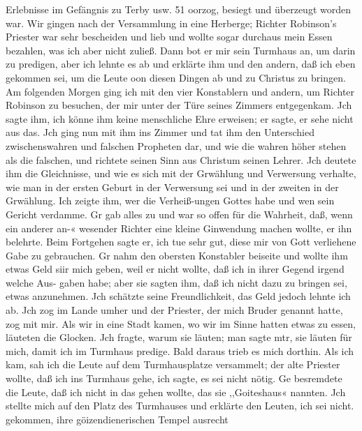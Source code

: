 Erlebnisse im Gefängnis zu Terby usw. 51
oorzog, besiegt und überzeugt worden war. Wir gingen nach
der Versammlung in eine Herberge; Richter Robinson’s Priester
war sehr bescheiden und lieb und wollte sogar durchaus mein
Essen bezahlen, was ich aber nicht zuließ. Dann bot er mir sein
Turmhaus an, um darin zu predigen, aber ich lehnte es ab und
erklärte ihm und den andern, daß ich eben gekommen sei, um die
Leute oon diesen Dingen ab und zu Christus zu bringen.
Am folgenden Morgen ging ich mit den vier Konstablern und
andern, um Richter Robinson zu besuchen, der mir unter der
Türe seines Zimmers entgegenkam. Jch sagte ihm, ich könne ihm
keine menschliche Ehre erweisen; er sagte, er sehe nicht aus das.
Jch ging nun mit ihm ins Zimmer und tat ihm den Unterschied
zwischenswahren und falschen Propheten dar, und wie die wahren
höher stehen als die falschen, und richtete seinen Sinn aus
Christum seinen Lehrer. Jch deutete ihm die Gleichnisse, und
wie es sich mit der Grwählung und Verwersung verhalte, wie
man in der ersten Geburt in der Verwersung sei und in der
zweiten in der Grwählung. Ich zeigte ihm, wer die Verheiß-ungen
Gottes habe und wen sein Gericht verdamme. Gr gab alles zu
und war so offen für die Wahrheit, daß, wenn ein anderer an-«
wesender Richter eine kleine Ginwendung machen wollte, er ihn
belehrte. Beim Fortgehen sagte er, ich tue sehr gut, diese mir
von Gott verliehene Gabe zu gebrauchen. Gr nahm den obersten
Konstabler beiseite und wollte ihm etwas Geld siir mich geben,
weil er nicht wollte, daß ich in ihrer Gegend irgend welche Aus-
gaben habe; aber sie sagten ihm, daß ich nicht dazu zu bringen
sei, etwas anzunehmen. Jch schätzte seine Freundlichkeit, das
Geld jedoch lehnte ich ab.
Jch zog im Lande umher und der Priester, der mich Bruder
genannt hatte, zog mit mir. Als wir in eine Stadt kamen, wo
wir im Sinne hatten etwas zu essen, läuteten die Glocken.
Jch fragte, warum sie läuten; man sagte mtr, sie läuten für mich,
damit ich im Turmhaus predige. Bald daraus trieb es mich
dorthin. Als ich kam, sah ich die Leute auf dem Turmhausplatze
versammelt; der alte Priester wollte, daß ich ins Turmhaus gehe,
  ich sagte, es sei nicht nötig. Ge besremdete die Leute, daß
ich nicht in das gehen wollte, das sie ,,Goiteshaus« nannten. Jch
stellte mich auf den Platz des Turmhauses und erklärte den Leuten,
ich sei nicht. gekommen, ihre göizendienerischen Tempel ausrecht
 


